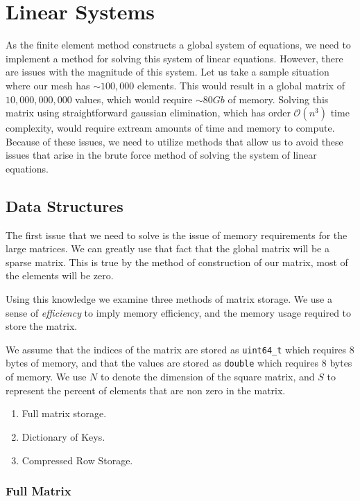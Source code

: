 \documentclass[../fem.tex]{subfiles}
\begin{document}
\section{Linear Systems}%
\label{sec:linear_systems}

As the finite element method constructs a global system of equations, we need
to implement a method for solving this system of linear equations. However,
there are issues with the magnitude of this system. Let us take a sample
situation where our mesh has $\sim 100,000$ elements. This would result in a
global matrix of $10,000,000,000$ values, which would require $\sim 80Gb$ of
memory. Solving this matrix using straightforward gaussian elimination, which
has order $\mathcal{O}(n^3)$ time complexity, would require extream amounts of
time and memory to compute. Because of these issues, we need to utilize methods
that allow us to avoid these issues that arise in the brute force method of
solving the system of linear equations.

\subsection{Data Structures}%
\label{sub:data_structures}

The first issue that we need to solve is the issue of memory requirements for
the large matrices. We can greatly use that fact that the global matrix will
be a sparse matrix. This is true by the method of construction of our matrix,
most of the elements will be zero.

Using this knowledge we examine three methods of matrix storage. We use a sense
of \textit{efficiency} to imply memory efficiency, and the memory usage required
to store the matrix.

We assume that the indices of the matrix are stored as
\texttt{uint64_t} which requires $8$ bytes of memory, and that the
values are stored as \texttt{double} which requires $8$ bytes of
memory. We use $N$ to denote the dimension of the square matrix, and $S$ to
represent the percent of elements that are non zero in the matrix.

\begin{enumerate}[label=\arabic*.]
  \item Full matrix storage.
  \item Dictionary of Keys.
  \item Compressed Row Storage.
\end{enumerate}

\subsubsection{Full Matrix}%
\label{ssub:full_matrix}
\end{document}
